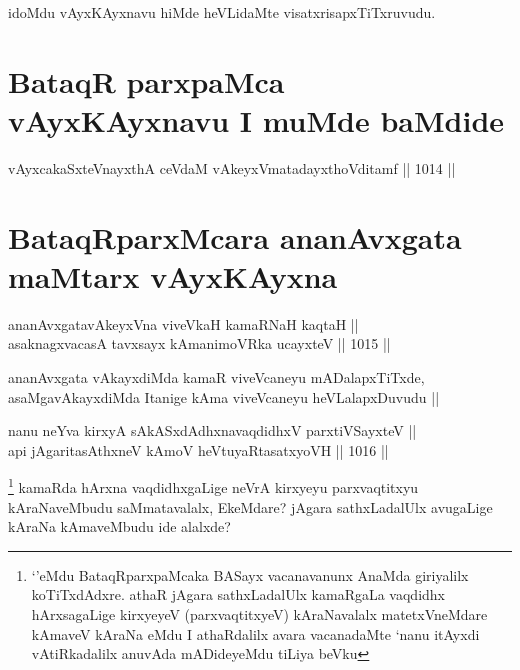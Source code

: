 \begin{artha}
idoMdu vAyxKAyxnavu hiMde heVLidaMte visatxrisapxTiTxruvudu.
\end{artha}

\section*{BataqR parxpaMca vAyxKAyxnavu I muMde baMdide}

\begin{shl}
vAyxcakaSxteV\s nayxthA ceVdaM vAkeyxVmatadayxthoVditamf ||  1014 ||  \\
\end{shl}


\section*{BataqRparxMcara ananAvxgata maMtarx vAyxKAyxna}


\begin{shl}
ananAvxgatavAkeyxVna viveVkaH kamaRNaH kaqtaH || \\
asaknagxvacasA tavxsayx kAmanimoVRka ucayxteV ||  1015 ||
\end{shl}

\begin{artha}
ananAvxgata vAkayxdiMda kamaR viveVcaneyu mADalapxTiTxde, asaMgavAkayxdiMda Itanige kAma viveVcaneyu heVLalapxDuvudu ||
\end{artha}


\begin{shl}
nanu neYva kirxyA sAkASxdAdhxnavaqdidhxV parxtiVSayxteV ||\\  
api jAgaritasAthxneV kAmoV heVtuyaRtasatxyoVH ||  1016 ||
\end{shl}

\begin{artha}
\footnote{`\stext'eMdu BataqRparxpaMcaka BASayx vacanavanunx AnaMda giriyalilx koTiTxdAdxre. athaR jAgara sathxLadalUlx kamaRgaLa vaqdidhx hArxsagaLige kirxyeyeV (parxvaqtitxyeV) kAraNavalalx matetxVneMdare kAmaveV kAraNa eMdu I athaRdalilx avara vacanadaMte `nanu itAyxdi vAtiRkadalilx anuvAda mADideyeMdu tiLiya beVku}
kamaRda hArxna vaqdidhxgaLige neVrA kirxyeyu parxvaqtitxyu kAraNaveMbudu saMmatavalalx, EkeMdare? jAgara sathxLadalUlx avugaLige kAraNa kAmaveMbudu ide alalxde?
\end{artha}

